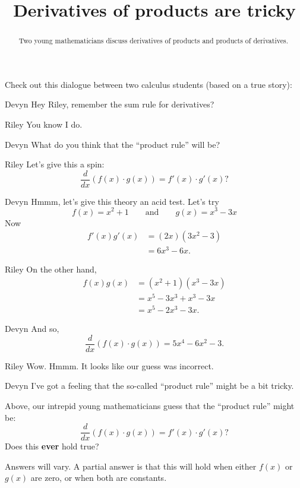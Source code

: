 \documentclass{ximera}
\title[Break-Ground:]{Derivatives of products are tricky}
\begin{document}
\begin{abstract}
Two young mathematicians discuss derivatives of products and products
of derivatives.
\end{abstract}
\maketitle

Check out this dialogue between two calculus students (based on a true
story):

\begin{dialogue}
\item[Devyn] Hey Riley, remember the sum rule for derivatives?
\item[Riley] You know I do.
\item[Devyn] What do you think that the ``product rule'' will be?
\item[Riley] Let's give this a spin:
  \[
  \frac{d}{dx} \left(f(x)\cdot g(x)\right) = f'(x) \cdot g'(x)?
  \]
\item[Devyn] Hmmm, let's give this theory an acid test. Let's try
  \[
  f(x) = x^2+1\qquad\text{and}\qquad g(x) = x^3-3x
  \]
  Now
  \begin{align*}
    f'(x)g'(x) &= (2x)(3x^2-3)\\
    &= 6x^3-6x.
  \end{align*}
\item[Riley] On the other hand,
  \begin{align*}
    f(x)g(x) &= (x^2+1)(x^3-3x)\\
    &=x^5-3x^3+x^3-3x\\
    &=x^5-2x^3-3x.
  \end{align*} 
\item[Devyn] And so, 
  \[
  \frac{d}{dx} \left(f(x) \cdot g(x)\right) = 5x^4-6x^2-3.
  \]
\item[Riley] Wow. Hmmm. It looks like our guess was incorrect.
\item[Devyn] I've got a feeling that the so-called ``product rule''
  might be a bit tricky.
\end{dialogue}

\begin{problem}
  Above, our intrepid young mathematicians guess that the ``product rule'' might be:
  \[
  \frac{d}{dx} \left(f(x)\cdot g(x)\right) = f'(x) \cdot g'(x)?
  \]
  Does this \textbf{ever} hold true?
  \begin{freeResponse}
    Answers will vary. A partial answer is that this will hold when
    either $f(x)$ or $g(x)$ are zero, or when both are constants.
  \end{freeResponse}
\end{problem}



%
\end{document}
